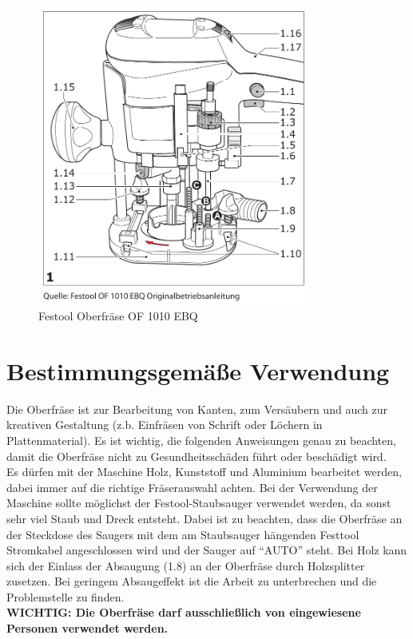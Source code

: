 \documentclass{\basedir/fablab-document}
\begin{document}
\begin{figure}[h!]
    \centering
    \includegraphics[width=0.8\textwidth]{bilder/oberfraese-sketch}
    \caption{Festool Oberfräse OF 1010 EBQ}
    \label{fig:sketch}
\end{figure}

\section{Bestimmungsgemäße Verwendung}
Die Oberfräse ist zur Bearbeitung von Kanten, zum Versäubern und auch zur kreativen Gestaltung (z.b. Einfräsen von Schrift oder Löchern in Plattenmaterial). Es ist wichtig, die folgenden Anweisungen genau zu beachten, damit die Oberfräse nicht zu Gesundheitsschäden führt oder beschädigt wird.\\
Es dürfen mit der Maschine Holz, Kunststoff und Aluminium bearbeitet werden, dabei immer auf die richtige Fräserauswahl achten. Bei der Verwendung der Maschine sollte möglichst der Festool-Staubsauger verwendet werden, da sonst sehr viel Staub und Dreck entsteht. Dabei ist zu beachten, dass die Oberfräse an der Steckdose des Saugers mit dem am Staubsauger hängenden Festtool Stromkabel angeschlossen wird und der Sauger auf \enquote{AUTO} steht. Bei Holz kann sich der Einlass der Absaugung (1.8) an der Oberfräse durch Holzsplitter zusetzen. Bei geringem Absaugeffekt ist die Arbeit zu unterbrechen und die Problemstelle zu finden.\\
\textbf{WICHTIG: Die Oberfräse darf ausschließlich von eingewiesene Personen verwendet werden.}
\end{document}
